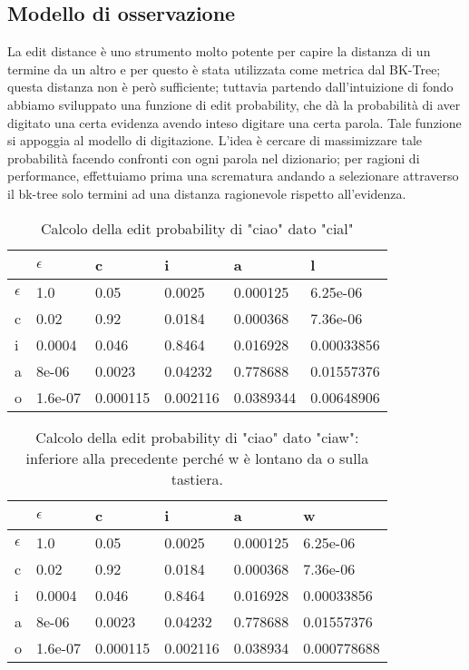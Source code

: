 \documentclass[a4paper,11pt]{article}
\begin{document}
	\subsection{Modello di osservazione}
		La edit distance\cite{levenshtein} è uno strumento molto potente per capire la distanza di un termine da un altro e per questo è stata utilizzata 
        come metrica dal
        BK-Tree; questa distanza non è però sufficiente; tuttavia partendo dall'intuizione di fondo abbiamo sviluppato una funzione di edit probability, 
        che dà la probabilità di aver digitato una certa evidenza avendo inteso digitare una certa parola. 
        Tale funzione si appoggia al modello di digitazione. 
   		L'idea è cercare di massimizzare tale probabilità facendo confronti con ogni parola nel dizionario; per ragioni di performance, effettuiamo prima una 
    	scrematura andando a selezionare attraverso il bk-tree solo termini ad una distanza ragionevole rispetto all'evidenza.
    \begin{table}
    \centering
    \begin{tabular}{l|l|l|l|l|l}
               & $\epsilon$ & c        & i        & a        & l \\ \hline
	$\epsilon$ & 1.0        & 0.05     & 0.0025   & 0.000125  & 6.25e-06    \\
    c          & 0.02       & 0.92     & 0.0184   & 0.000368  & 7.36e-06    \\
    i          & 0.0004     & 0.046    & 0.8464   & 0.016928  & 0.00033856  \\
    a          & 8e-06      & 0.0023   & 0.04232  & 0.778688  & 0.01557376  \\
    o          & 1.6e-07    & 0.000115 & 0.002116 & 0.0389344 & 0.00648906  \\

    \end{tabular}
    \caption{Calcolo della edit probability di "ciao" dato "cial"}
    \end{table}
    \begin{table}
    \centering 
    \begin{tabular}{l|l|l|l|l|l}
               & $\epsilon$ & c        & i        & a        & w \\ \hline
	$\epsilon$ & 1.0        & 0.05     & 0.0025   & 0.000125 & 6.25e-06 \\ 
    c          & 0.02       & 0.92     & 0.0184   & 0.000368 & 7.36e-06 \\
    i          & 0.0004     & 0.046    & 0.8464   & 0.016928 & 0.00033856 \\
    a          & 8e-06      & 0.0023   & 0.04232  & 0.778688 & 0.01557376 \\
    o          & 1.6e-07    & 0.000115 & 0.002116 & 0.038934 & 0.000778688 \\    
    \end{tabular}
    \caption{Calcolo della edit probability di "ciao" dato "ciaw": inferiore alla precedente perché w è lontano da o sulla tastiera.}
    \end{table}
\end{document}
